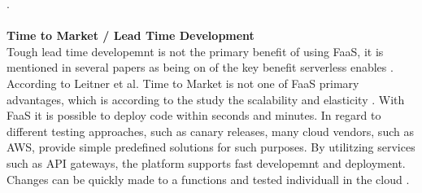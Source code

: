 \documentclass[11pt]{article}
\begin{document}
\cite{elgamal2018costless}.\\\\ \textbf{Time to Market / Lead Time Development}\\ Tough lead time developemnt is not the primary benefit of using FaaS, it is mentioned in several papers as being on of the key benefit serverless enables \cite{adzic2017serverless} \cite{ast2017self}. According to Leitner et al. Time to Market is not one of FaaS primary advantages, which is according to the study the scalability and elasticity \cite{leitner2019mixed}. With FaaS it is possible to deploy code within seconds and minutes. In regard to different testing approaches, such as canary releases, many cloud vendors, such as AWS, provide simple predefined solutions for such purposes. By utilitzing services such as API gateways, the platform supports fast developemnt and deployment. Changes can be quickly made to a functions and tested individuall in the cloud \cite{sewak2018winning}.\\\\
\end{document}
